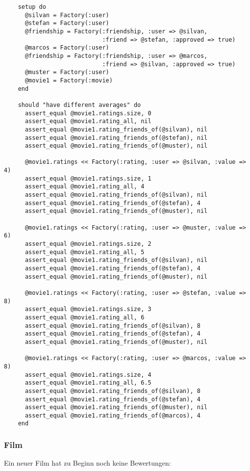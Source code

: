 \begin{verbatim}
    setup do 
      @silvan = Factory(:user)
      @stefan = Factory(:user)
      @friendship = Factory(:friendship, :user => @silvan, 
                            :friend => @stefan, :approved => true)
      @marcos = Factory(:user)
      @friendship = Factory(:friendship, :user => @marcos, 
                            :friend => @silvan, :approved => true)
      @muster = Factory(:user)
      @movie1 = Factory(:movie)
    end
    
    should "have different averages" do
      assert_equal @movie1.ratings.size, 0
      assert_equal @movie1.rating_all, nil
      assert_equal @movie1.rating_friends_of(@silvan), nil 
      assert_equal @movie1.rating_friends_of(@stefan), nil 
      assert_equal @movie1.rating_friends_of(@muster), nil 
      
      @movie1.ratings << Factory(:rating, :user => @silvan, :value => 4)
      assert_equal @movie1.ratings.size, 1
      assert_equal @movie1.rating_all, 4
      assert_equal @movie1.rating_friends_of(@silvan), nil 
      assert_equal @movie1.rating_friends_of(@stefan), 4 
      assert_equal @movie1.rating_friends_of(@muster), nil
      
      @movie1.ratings << Factory(:rating, :user => @muster, :value => 6)
      assert_equal @movie1.ratings.size, 2
      assert_equal @movie1.rating_all, 5
      assert_equal @movie1.rating_friends_of(@silvan), nil 
      assert_equal @movie1.rating_friends_of(@stefan), 4 
      assert_equal @movie1.rating_friends_of(@muster), nil
      
      @movie1.ratings << Factory(:rating, :user => @stefan, :value => 8)
      assert_equal @movie1.ratings.size, 3
      assert_equal @movie1.rating_all, 6
      assert_equal @movie1.rating_friends_of(@silvan), 8 
      assert_equal @movie1.rating_friends_of(@stefan), 4 
      assert_equal @movie1.rating_friends_of(@muster), nil
      
      @movie1.ratings << Factory(:rating, :user => @marcos, :value => 8)
      assert_equal @movie1.ratings.size, 4
      assert_equal @movie1.rating_all, 6.5
      assert_equal @movie1.rating_friends_of(@silvan), 8
      assert_equal @movie1.rating_friends_of(@stefan), 4 
      assert_equal @movie1.rating_friends_of(@muster), nil
      assert_equal @movie1.rating_friends_of(@marcos), 4
    end
\end{verbatim}

\subsubsection{Film}
Ein neuer Film hat zu Beginn noch keine Bewertungen:

